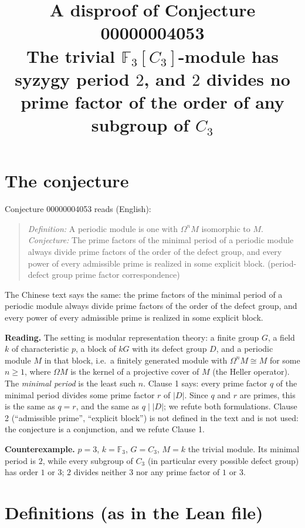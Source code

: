 \documentclass[11pt]{article}
\title{A disproof of Conjecture 00000004053\\[2pt]
\large The trivial $\mathbb{F}_3[C_3]$-module has syzygy period $2$, and $2$ divides no prime factor of the order of any subgroup of $C_3$}
\date{}
\renewcommand{\_}{\oldus\allowbreak}
\theoremstyle{definition}
\theoremstyle{remark}
\begin{document}
\sloppy
\maketitle

\section{The conjecture}

Conjecture 00000004053 reads (English):
\begin{quote}
\emph{Definition:} A periodic module is one with $\Omega^n M$ isomorphic to $M$.
\emph{Conjecture:} The prime factors of the minimal period of a periodic module always divide
prime factors of the order of the defect group, and every power of every admissible prime is
realized in some explicit block. (period-defect group prime factor correspondence)
\end{quote}
The Chinese text says the same: the prime factors of the minimal period of a periodic module
always divide prime factors of the order of the defect group, and every power of every admissible
prime is realized in some explicit block.

\textbf{Reading.} The setting is modular representation theory: a finite group $G$, a field $k$ of
characteristic $p$, a block of $kG$ with its defect group $D$, and a periodic module $M$ in that
block, i.e.\ a finitely generated module with $\Omega^n M\cong M$ for some $n\ge 1$, where
$\Omega M$ is the kernel of a projective cover of $M$ (the Heller operator). The \emph{minimal
period} is the least such $n$. Clause 1 says: every prime factor $q$ of the minimal period divides
some prime factor $r$ of $|D|$. Since $q$ and $r$ are primes, this is the same as $q=r$, and the
same as $q\mid |D|$; we refute both formulations. Clause 2 (``admissible prime'', ``explicit
block'') is not defined in the text and is not used: the conjecture is a conjunction, and we
refute Clause 1.

\textbf{Counterexample.} $p=3$, $k=\mathbb{F}_3$, $G=C_3$, $M=k$ the trivial module. Its minimal
period is $2$, while every subgroup of $C_3$ (in particular every possible defect group) has order
$1$ or $3$; $2$ divides neither $3$ nor any prime factor of $1$ or $3$.

\section{Definitions (as in the Lean file)}
\end{document}
